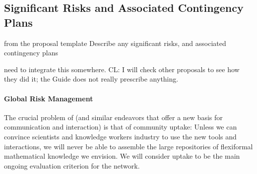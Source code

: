 \subsection{Significant Risks and Associated Contingency Plans}\label{sec:risks}
\begin{todo}{from the proposal template}
  Describe any significant risks, and associated contingency plans
\end{todo}
\begin{oldpart}{need to integrate this somewhere. CL: I will check other proposals to see how they did it; the Guide does not really prescribe anything.}
\paragraph{Global Risk Management}
The crucial problem of \pn (and similar endeavors that offer a new basis for communication
and interaction) is that of community uptake: Unless we can convince scientists and
knowledge workers industry to use the new tools and interactions, we will
never be able to assemble the large repositories of flexiformal mathematical knowledge we
envision. We will consider uptake to be the main ongoing evaluation criterion for the network.
\end{oldpart}

